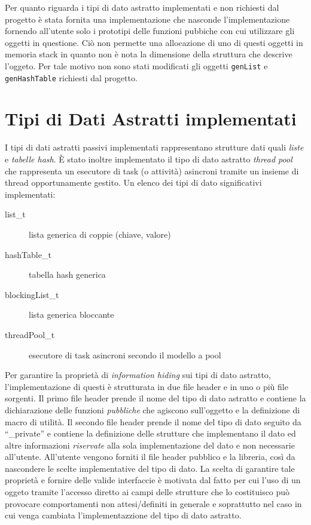 \documentclass[a4paper,10pt]{article}
\begin{document}
Per quanto riguarda i tipi di dato astratto implementati e non
richiesti dal progetto \`e stata fornita una implementazione che
nasconde l'implementazione fornendo all'utente solo i prototipi delle
funzioni pubbiche con cui utilizzare gli oggetti in questione. Ci\`o
non permette una allocazione di uno di questi oggetti in memoria stack
in quanto non \`e nota la dimensione della struttura che descrive
l'oggeto. Per tale motivo non sono stati modificati gli oggetti
\texttt{genList} e \texttt{genHashTable} richiesti dal progetto.


\section{Tipi di Dati Astratti implementati}
I tipi di dati astratti passivi implementati rappresentano strutture
dati quali \emph{liste} e \emph{tabelle hash}. \`E stato inoltre
implementato il tipo di dato astratto \emph{thread pool} che
rappresenta un esecutore di task (o attivit\`a) asincroni tramite un
insieme di thread opportunamente gestito. Un elenco dei tipi di dato
significativi implementati:
\begin{description}
  \item[list\_t] lista generica di coppie (chiave, valore)
  \item[hashTable\_t] tabella hash generica
  \item[blockingList\_t] lista generica bloccante
  \item[threadPool\_t] esecutore di task asincroni secondo il modello a
    pool
\end{description}
Per garantire la propriet\`a di \emph{information hiding} sui tipi di
dato astratto, l'imple\-mentazione di questi \`e strutturata in due
file header e in uno o pi\`u file sorgenti. Il primo file header
prende il nome del tipo di dato astratto e contiene la dichiarazione
delle funzioni \emph{pubbliche} che agiscono sull'oggetto e la
definizione di macro di utilit\`a. Il secondo file header prende il
nome del tipo di dato seguito da ``\_private'' e contiene la
definizione delle strutture che implementano il dato ed altre
informazioni \emph{riservate} alla sola implementazione del dato e non
necessarie all'utente. All'utente vengono forniti il file header
pubblico e la libreria, cos\`i da nascondere le scelte implementative
del tipo di dato. La scelta di garantire tale propriet\`a e fornire
delle valide interfaccie \`e motivata dal fatto per cui l'uso di un
oggeto tramite l'accesso diretto ai campi delle strutture che lo
costituisco pu\`o provocare comportamenti non attesi/definiti in
generale e soprattutto nel caso in cui venga cambiata
l'implementazzione del tipo di dato astratto.
\end{document}
